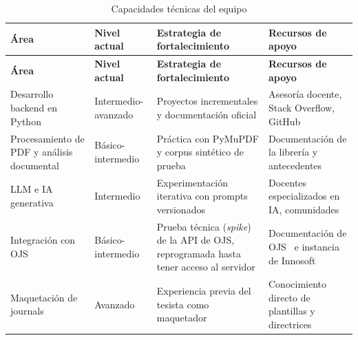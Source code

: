 {\small
\begin{longtable}{@{}>{\raggedright\arraybackslash}p{}>{\raggedright\arraybackslash}p{}>{\raggedright\arraybackslash}p{}>{\raggedright\arraybackslash}p{}@{}}
\caption{Capacidades técnicas del equipo}\label{tab:2-3}\\
\toprule
\textbf{Área} & \textbf{Nivel actual} & \textbf{Estrategia de fortalecimiento} & \textbf{Recursos de apoyo} \\
\midrule
\endfirsthead
\toprule
\textbf{Área} & \textbf{Nivel actual} & \textbf{Estrategia de fortalecimiento} & \textbf{Recursos de apoyo} \\
\midrule
\endhead
\bottomrule
\endfoot
\endlastfoot
Desarrollo backend en Python & Intermedio-avanzado & Proyectos incrementales y documentación oficial & Asesoría docente, Stack Overflow, GitHub \\
Procesamiento de PDF y análisis documental & Básico-intermedio & Práctica con PyMuPDF y corpus sintético de prueba & Documentación de la librería y antecedentes \\
LLM e IA generativa & Intermedio & Experimentación iterativa con prompts versionados & Docentes especializados en IA, comunidades \\
Integración con OJS & Básico-intermedio & Prueba técnica (\emph{spike}) de la API de OJS, reprogramada hasta tener acceso al servidor & Documentación de OJS~\cite{ref35} e instancia de Innosoft \\
Maquetación de journals & Avanzado & Experiencia previa del tesista como maquetador & Conocimiento directo de plantillas y directrices \\
\end{longtable}
}

